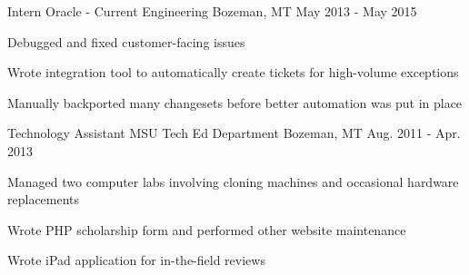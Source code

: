 \begin{cventries}
  \cventry
    {Intern} %
    {Oracle - Current Engineering} %
    {Bozeman, MT} %
    {May 2013 - May 2015} %
    {
      \begin{cvitems} %
        \item {Debugged and fixed customer-facing issues}
        \item {Wrote integration tool to automatically create tickets for high-volume exceptions}
        \item {Manually backported many changesets before better automation was put in place}
      \end{cvitems}
    }

  \cventry
    {Technology Assistant} %
    {MSU Tech Ed Department} %
    {Bozeman, MT} %
    {Aug. 2011 - Apr. 2013} %
    {
      \begin{cvitems} %
        \item {Managed two computer labs involving cloning machines and occasional hardware replacements}
        \item {Wrote PHP scholarship form and performed other website maintenance}
        \item {Wrote iPad application for in-the-field reviews}
      \end{cvitems}
    }

\end{cventries}
